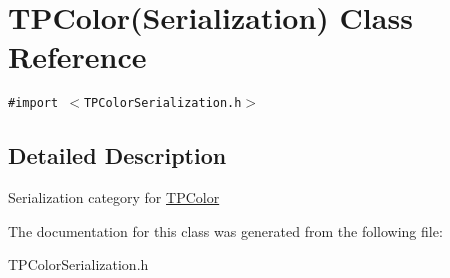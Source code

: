 \hypertarget{interface_t_p_color_07_serialization_08}{
\section{TPColor(Serialization) Class Reference}
\label{interface_t_p_color_07_serialization_08}
}
{\tt \#import $<$TPColorSerialization.h$>$}



\subsection{Detailed Description}
Serialization category for \hyperlink{interface_t_p_color}{TPColor} 

The documentation for this class was generated from the following file:\begin{CompactItemize}
\item 
TPColorSerialization.h\end{CompactItemize}
